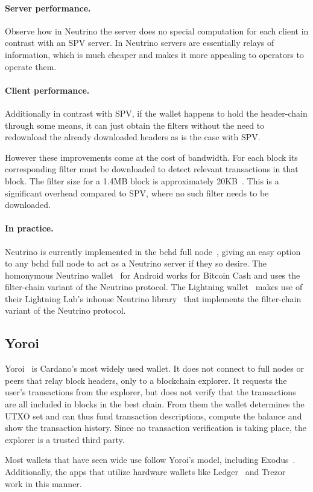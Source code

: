 \paragraph{Server performance.} Observe how in Neutrino the server does no special computation for each client in contrast with an SPV server. In Neutrino servers are essentially relays of information, which is much cheaper and makes it more appealing to operators to operate them.
\paragraph{Client performance.} Additionally in contrast with SPV, if the wallet happens to hold the header-chain through some means, it can just obtain the filters without the need to redownload the already downloaded headers as is the case with SPV.

However these improvements come at the cost of bandwidth. For each block its corresponding filter must be downloaded to detect relevant transactions in that block. The filter size for a 1.4MB block is approximately 20KB~\cite{jimmysong}. This is a significant overhead compared to SPV, where no such filter needs to be downloaded.

\paragraph{In practice.}
Neutrino is currently implemented in the bchd full node~\cite{bchd}, giving an easy option to any bchd full node to act as a Neutrino server if they so desire. The homonymous Neutrino wallet~\cite{neutrino-wallet} for Android works for Bitcoin Cash and uses the filter-chain variant of the Neutrino protocol. The Lightning wallet~\cite{lightning-wallet} makes use of their Lightning Lab's inhouse Neutrino library~\cite{neutrino-library} that implements the filter-chain variant of the Neutrino protocol.

\subsection{Yoroi}
Yoroi~\cite{yoroi} is Cardano's most widely used wallet. It does not connect to full nodes or peers that relay block headers, only to a blockchain explorer. It requests the user's transactions from the explorer, but does not verify that the transactions are all included in blocks in the best chain. From them the wallet determines the UTXO set and can thus fund transaction descriptions, compute the balance and show the transaction history. Since no transaction verification is taking place, the explorer is a trusted third party.

Most wallets that have seen wide use follow Yoroi's model, including Exodus~\cite{exodus}. Additionally, the apps that utilize hardware wallets like Ledger~\cite{ledger-live} and Trezor~\cite{trezor-beta} work in this manner.

